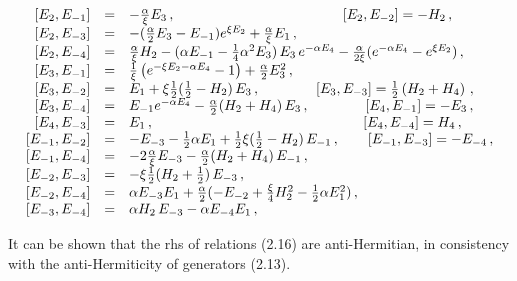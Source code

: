 \documentclass[a4paper,12pt,showkeys]{article}
\begin{document}
\begin{equation}
\begin{array}{rrl}
\cr [ E_2 , E_{-1} ]& =& - \frac{\alpha}{\xi} E_3 \, ,
\qquad \qquad \qquad\qquad\qquad \qquad
 [ E_2 , E_{-2} ] = - H_2 \, ,
\cr
 [ E_2 , E_{-3} ]& =& - ( \frac{\alpha}{2}E_3 - E_{-1})e^{\xi E_2}
+\frac{\alpha}{\xi} E_1 \, ,
\cr [ E_2 , E_{-4} ]& =&  \frac{\alpha}{\xi} H_2
    -  ( \alpha E_{-1} - \frac{1}{4} \alpha^2 E_3)\, E_3 \,
    e^{- \alpha E_4} - \frac{\alpha}{2 \xi} (e^{-\alpha E_4}
    - e^{\xi E_2}) \, ,
\cr [ E_3 , E_{-1} ]& =& \frac{1}{\xi}
    \left( e^{-\xi E_2 - \alpha E_4}-1 \right)
    + \frac{\alpha}{2} E^2_3  \, ,
\cr [ E_3 , E_{-2} ]& =& E_1
    +\xi \frac{1}{2}(\frac{1}{2}-H_2 )\, E_3 \, ,
\qquad\qquad
[ E_3 , E_{-3} ] =  \frac{1}{2} \left( H_2 + H_4 \right)\, ,
\cr [ E_3 , E_{-4} ]& =& E_{-1}e^{-\alpha E_4} -\frac{\alpha}{2}
    (H_2 + H_4)\, E_3 \, ,
\qquad\qquad [ E_4 , E_{-1} ] =  - E_3 \, ,
\cr [ E_4 , E_{-3} ]& =& E_1 \, ,
\qquad\quad\qquad\qquad \qquad\qquad\qquad \qquad [ E_4 , E_{-4} ] = H_4 \, ,
\cr [ E_{-1} ,E_{-2} ]& =& - E_{-3} - \frac{1}{2} \alpha E_1 +
    \frac{1}{2} \xi (\frac{1}{2} - H_2 )\, E_{-1} \, ,
\qquad
 [ E_{-1} , E_{-3} ] =  - E_{-4} \, ,
\cr [ E_{-1} , E_{-4} ]& =& -2\frac{\alpha}{\xi} E_{-3}
    - \frac{\alpha}{2}(H_2 + H_4)\, E_{-1} \, ,
\cr
 [ E_{-2} , E_{-3} ] &=& - \xi \frac{1}{2}(H_2 + \frac{1}{2})\, E_{-3} \, ,
\cr [ E_{-2} , E_{-4} ]& =&  \alpha E_{-3} E_1 + \frac{\alpha}{2}
    (-E_{-2} + \frac{\xi}{4}H^2_2 -\frac{1}{2}\alpha E^2_1) \, ,
\cr [ E_{-3} , E_{-4} ]& =&  \alpha H_2 \, E_{-3} - \alpha E_{-4} E_1 \, ,
\end{array}
\end{equation}

It can be shown that the rhs of relations (2.16) are
anti-Hermitian, in consistency with the anti-Hermiticity of
generators (2.13).
\end{document}

